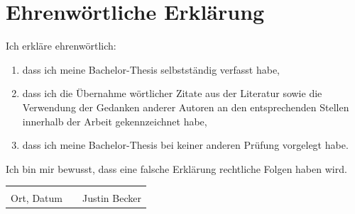 \documentclass[
	12pt, %
	a4paper,
	liststotoc, %
	bibtotoc, %
	pointlessnumbers, %
	ngerman, %
	headsepline, %
	oneside %
	]{scrbook} %
\newcommand{\studentName}{Justin Becker}
\begin{document}




\chapter*{Ehrenwörtliche Erklärung}

\thispagestyle{empty}

Ich erkläre ehrenwörtlich:
\begin{enumerate}
	\item dass ich meine Bachelor-Thesis selbstständig verfasst habe,
	\item dass ich die Übernahme wörtlicher Zitate aus der Literatur sowie die Verwendung der Gedanken anderer Autoren an den entsprechenden Stellen innerhalb der Arbeit gekennzeichnet habe,
	\item dass ich meine Bachelor-Thesis bei keiner anderen Prüfung vorgelegt habe.
\end{enumerate}
Ich bin mir bewusst, dass eine falsche Erklärung rechtliche Folgen haben wird.
\vspace{2cm}

\begin{tabular}{lp{4em}l} 
 \hspace{5cm}   && \hspace{4cm} \\\cline{1-1}\cline{3-3} 
 Ort, Datum     && \studentName
\end{tabular}
\end{document}
